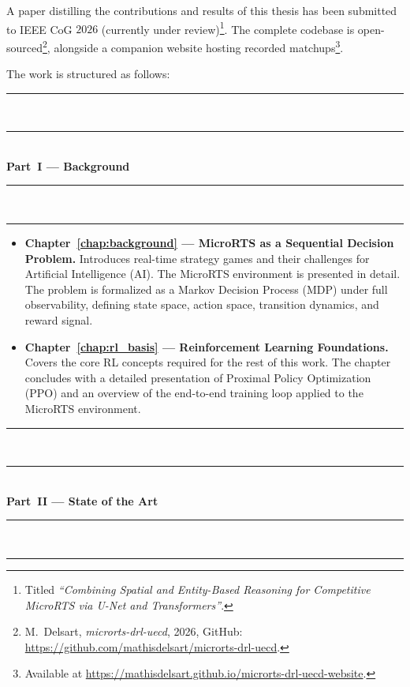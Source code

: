 \medskip

A paper distilling the contributions and results of this thesis has been submitted to IEEE CoG $2026$ (currently under review)\footnote{Titled \emph{``Combining Spatial and Entity-Based Reasoning for Competitive MicroRTS via U-Net and Transformers''}.}. The complete codebase is open-sourced\footnote{M.~Delsart, \emph{microrts-drl-uecd}, 2026, GitHub: \url{https://github.com/mathisdelsart/microrts-drl-uecd}.}, alongside a companion website hosting recorded  matchups\footnote{Available at \url{https://mathisdelsart.github.io/microrts-drl-uecd-website}.}.

\medskip

The work is structured as follows:

\rule{\linewidth}{0.4pt}\\[-1.0em]
        \rule{\linewidth}{0.4pt}\\[+0.0em]
        \textbf{Part~I --- Background}\\[-0.5em]
        \rule{\linewidth}{0.4pt}\\[-1.0em]
        \rule{\linewidth}{0.4pt}
        
\begin{itemize}

    \item \textbf{Chapter~\ref{chap:background} --- MicroRTS as a Sequential Decision Problem.} Introduces real-time strategy games and their challenges for Artificial Intelligence (AI). The MicroRTS environment is presented in detail. The problem is formalized as a Markov Decision Process (MDP) under full observability, defining state space, action space, transition dynamics, and reward signal.

    \item \textbf{Chapter~\ref{chap:rl_basis} --- Reinforcement Learning Foundations.} Covers the core RL concepts required for the rest of this work. The chapter concludes with a detailed presentation of Proximal Policy Optimization (PPO) and an overview of the end-to-end training loop applied to the MicroRTS environment.

\end{itemize}

\rule{\linewidth}{0.4pt}\\[-1.0em]
        \rule{\linewidth}{0.4pt}\\[+0.0em]
        \textbf{Part~II --- State of the Art}\\[-0.5em]
        \rule{\linewidth}{0.4pt}\\[-1.0em]
        \rule{\linewidth}{0.4pt}
        
